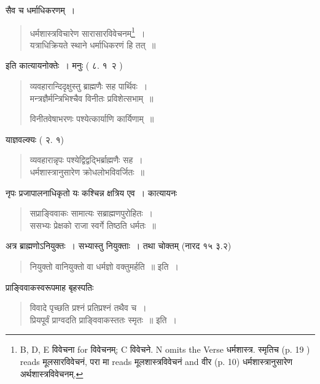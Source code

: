 \documentclass[11pt, openany]{book}
\begin{document}
\newpage
{}
\fancyhead[RO]{[ $\S$ २}
\fancyhead[LE]{$\S$ २ ]}


सैव च धर्माधिकरणम्~। 

\begin{quote}
{\vy धर्मशास्त्रविचारेण सारासारविवेचनम्\renewcommand{\thefootnote}{1}\footnote{B, D, E विवेचना for विवेचनम्; C विवेचने. N omits the Verse धर्मशास्त्र. स्मृतिच (p. 19 ) reads मूलसारविवेचनं, परा मा reads मूलशास्त्रविवेचनं and वीर (p. 10) धर्मशास्त्रानुसारेण अर्थशास्त्रविवेचनम्.}~।\\
यत्राधिक्रियते स्थाने धर्माधिकरणं हि तत्~॥}
\end{quote}

इति कात्यायनोक्तेः~। मनुः ( ८. १\textendash\ २ )

\begin{quote}
{\vy व्यवहारान्दिदृक्षुस्तु ब्राह्मणैः सह पार्थिवः~।\\
मन्त्रज्ञैर्मन्त्रिभिश्चैव विनीतः प्रविशेत्सभाम्~॥

विनीतवेषाभरणः पश्येत्कार्याणि कार्यिणाम्~॥}
\end{quote}

याज्ञवल्क्यः ( २. १)

\begin{quote}
{\vy व्यवहारान्नृपः पश्येद्विद्वद्भिर्ब्राह्मणैः सह~।\\
धर्मशास्त्रानुसारेण क्रोधलोभविवर्जितः~॥}
\end{quote}

नृपः प्रजापालनाधिकृतो यः कश्चिन्न क्षत्रिय एव~। कात्यायनः

\begin{quote}
{\vy सप्राङ्विवाकः सामात्यः सब्राह्मणपुरोहितः~।\\
ससभ्यः प्रेक्षको राजा स्वर्गे तिष्ठति धर्मतः~॥}
\end{quote}

अत्र ब्राह्मणोऽनियुक्तः~। सभ्यास्तु नियुक्ताः~। तथा चोक्तम् (नारद १५ ३.२)

\begin{quote}
{\vy नियुक्तो वानियुक्तो वा धर्मज्ञो वक्तुमर्हति~॥} इति~।
\end{quote}

प्राङ्विवाकस्वरूपमाह बृहस्पतिः

\begin{quote}
{\vy विवादे पृच्छति प्रश्नं प्रतिप्रश्नं तथैव च~।\\
प्रियपूर्वं प्राग्वदति प्राङ्विवाकस्ततः स्मृतः~॥} इति~।
\end{quote}
\end{document}
